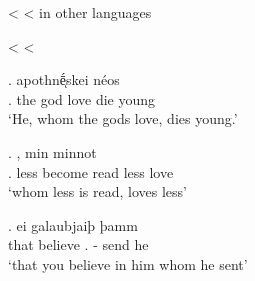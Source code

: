 \documentclass[xcolor=dvipsnames,10pt]{beamer}
\begin{document}
\begin{frame}[t]{ <  <  in other languages}

\pause

\center
{} <  < 

\pause

\exg.     apothnḗͅskei néos\\
.\textcolor{LimeGreen}{} the god love\textcolor{LimeGreen}{\scsub{[acc]}} die\textcolor{Turquoise}{\scsub{[nom]}} young\\
`He, whom the gods love, dies young.' \label{ex:ag-nom-acc}

\pause

\exg.    , min minnot\\
.\textcolor{red}{} less become read\textcolor{red}{\scsub{[dat]}} less love\textcolor{Turquoise}{\scsub{[nom]}}\\
`whom less is read, loves less' \label{ex:ohg-nom-dat}

\pause

\exg. ei galaubjaiþ þamm   \\
that believe\textcolor{red}{\scsub{[dat]}} .\textcolor{red}{} - {send}\textcolor{LimeGreen}{\scsub{[acc]}} he\\
`that you believe in him whom he sent' \label{ex:gothic-dat-acc}

\end{frame}
\end{document}
